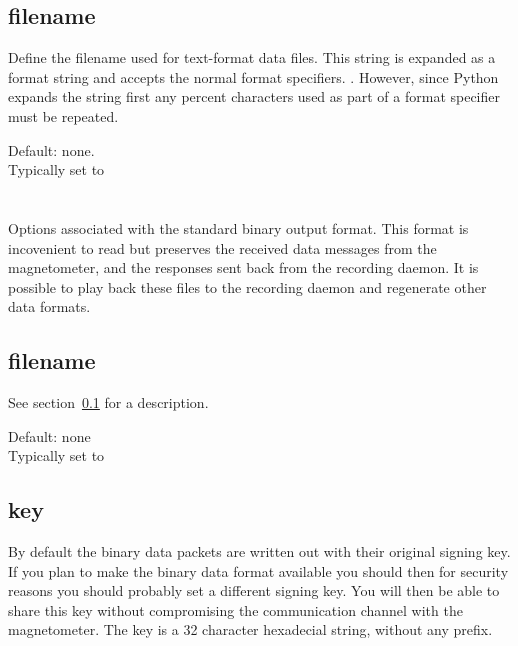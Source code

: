 \subsection{filename}
\label{sec:config-data-filename}
Define the filename used for text-format data files. This string is
expanded as a  format string and accepts the normal
 format specifiers. . However, since Python expands the string
first any percent characters used as part of a  format
specifier must be repeated.

Default: none.\\
Typically set to 


\section{\code{[awpacket]}}
Options associated with the standard binary output format. This format
is incovenient to read but preserves the received data messages from
the magnetometer, and the responses sent back from the recording
daemon. It is possible to play back these files to the recording
daemon and regenerate other data formats.

\subsection{filename}

See section~\ref{sec:config-data-filename} for a description.

Default: none\\
Typically set to 

\subsection{key}
By default the binary data packets are written out with their original
signing key. If you plan to make the binary data format available you
should then for security reasons you should probably set a different
signing key. You will then be able to share this key without
compromising the communication channel with the magnetometer. The key
is a 32 character hexadecial string, without any  prefix.

